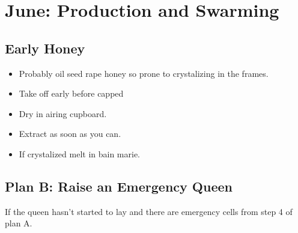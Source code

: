 \section{June: Production and Swarming}

\subsection{Early Honey}

\begin{itemize}
    \item Probably oil seed rape honey so prone to crystalizing in the frames.
    \item Take off early before capped
    \item Dry in airing cupboard.
    \item Extract as soon as you can.
    \item If crystalized melt in bain marie.
\end{itemize}


\subsection{Plan B: Raise an Emergency Queen}

If the queen hasn't started to lay and there are emergency cells from step 4 of plan A.




